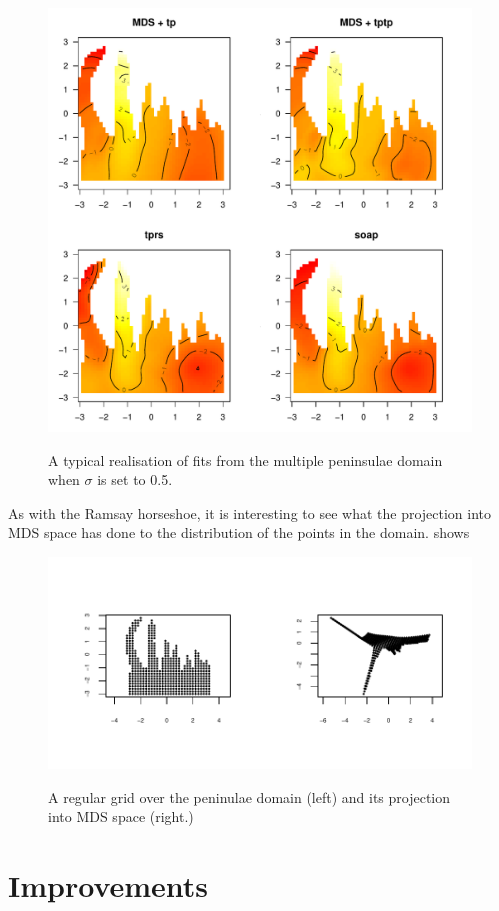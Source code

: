 \begin{figure}
\centering
\includegraphics[width=6in]{mds/figs/wt2-fit-05.pdf} \\
\caption{A typical realisation of fits from the multiple peninsulae domain when $\sigma$ is set to 0.5.}
\label{wt2-fit-0.5}
\end{figure}

As with the Ramsay horseshoe, it is interesting to see what the projection into MDS space has done to the distribution of the points in the domain.  shows

\begin{figure}
\centering
\includegraphics[width=6in,trim=0.5in 0.5in 0in 0.5in]{mds/figs/mdswt2points.pdf} \\
\caption{A regular grid over the peninulae domain (left) and its projection into MDS space (right.)}
\label{mdswt2points}
\end{figure}

\section{Improvements}
\label{MDSimprov}
